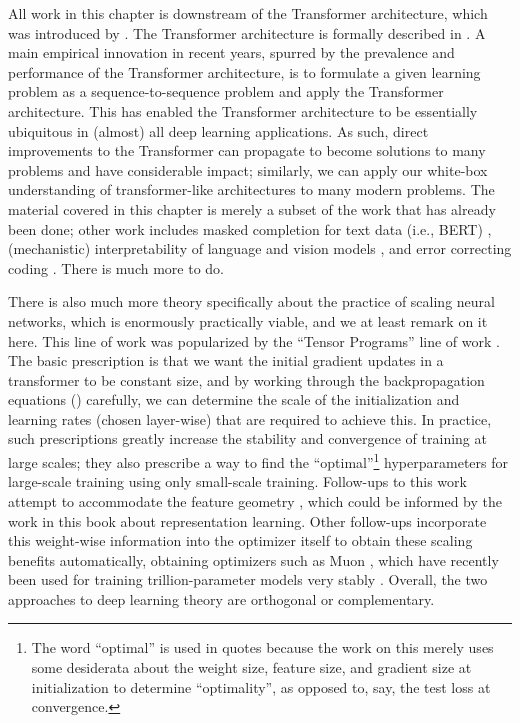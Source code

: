 \documentclass[../../book-main.tex]{subfiles}
\begin{document}
All work in this chapter is downstream of the Transformer architecture, which was introduced by \citet{vaswani2017attention}. The Transformer architecture is formally described in . A main empirical innovation in recent years, spurred by the prevalence and performance of the Transformer architecture, is to formulate a given learning problem as a sequence-to-sequence problem and apply the Transformer architecture. This has enabled the Transformer architecture to be essentially ubiquitous in (almost) all deep learning applications. As such, direct improvements to the Transformer can propagate to become solutions to many problems and have considerable impact; similarly, we can apply our white-box understanding of transformer-like architectures to many modern problems. The material covered in this chapter is merely a subset of the work that has already been done; other work includes masked completion for text data (i.e., BERT) \citep{devlin2019bert,yu2024white}, (mechanistic) interpretability of language and vision models \citep{bai2024improving}, and error correcting coding \citep{zheng2025white}. There is much more to do.

There is also much more theory specifically about the practice of scaling neural networks, which is enormously practically viable, and we at least remark on it here. This line of work was popularized by the ``Tensor Programs'' line of work \citep{yang2022tensor}. The basic prescription is that we want the initial gradient updates in a transformer to be constant size, and by working through the backpropagation equations () carefully, we can determine the scale of the initialization and learning rates (chosen layer-wise) that are required to achieve this. In practice, such prescriptions greatly increase the stability and convergence of training at large scales; they also prescribe a way to find the ``optimal''\footnote{The word ``optimal'' is used in quotes because the work on this merely uses some desiderata about the weight size, feature size, and gradient size at initialization to determine ``optimality'', as opposed to, say, the test loss at convergence.} hyperparameters for large-scale training using only small-scale training. Follow-ups to this work attempt to accommodate the feature geometry \citep{bernstein2024oldoptimizernewnorm}, which could be informed by the work in this book about representation learning. Other follow-ups incorporate this weight-wise information into the optimizer itself to obtain these scaling benefits automatically, obtaining optimizers such as Muon \citep{jordan6muon}, which have recently been used for training trillion-parameter models very stably \citep{moonshot2025kimi}. Overall, the two approaches to deep learning theory are orthogonal or complementary.
\end{document}
